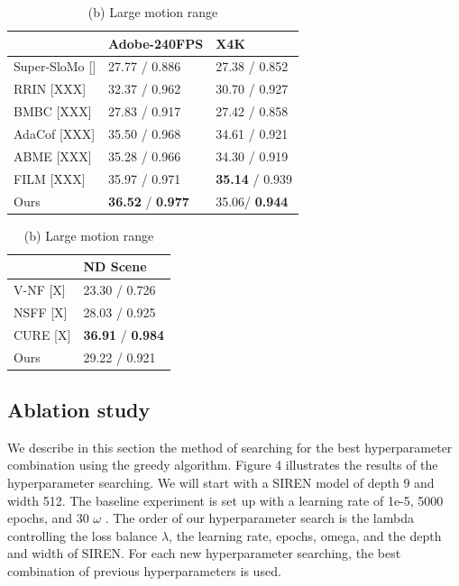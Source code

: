 \documentclass{article}
\begin{document}
\begin{table}[!tb]
    \caption{Quantitative comparison to state-of-the-art VFI on Standard benchmarks. Results are formatted as PSNR / SSMI.}
    \begin{minipage}{.5\linewidth}
      \centering
      \caption*{(a) Limited motion range}
      \begin{tabular}[t]{l | l | l }
       &  Adobe-240FPS &  X4K  \\
      \hline
      Super-SloMo [] &  27.77 / 0.886 & 27.38 / 0.852  \\
      RRIN [XXX]  & 32.37 / 0.962 & 30.70 / 0.927  \\
      BMBC [XXX]  & 27.83 / 0.917 & 27.42 / 0.858   \\
      AdaCof [XXX] & 35.50 / 0.968 & 34.61 / 0.921 \\
      ABME   [XXX] & 35.28 / 0.966 & 34.30 / 0.919 \\
      FILM   [XXX] &	35.97 / 0.971 & \textbf{35.14} / 0.939 \\
      Ours	& \textbf{36.52} / \textbf{0.977} & 35.06/ \textbf{0.944} \\
      \end{tabular}
    \end{minipage}%
    \begin{minipage}{.5\linewidth}
      \centering
      \caption*{(b) Large motion range}
        \begin{tabular}[t]{l | l }
        	    &   ND Scene  \\
        \hline
        V-NF [X]   &  23.30 / 0.726 \\
        NSFF [X]   & 28.03 / 0.925 \\
        CURE [X]   & \textbf{36.91} / \textbf{0.984} \\
        Ours	     & 29.22 / 0.921
        \end{tabular}
    \end{minipage}
\end{table}

\subsection{Ablation study}
\label{sec_abl}


We describe in this section the method of searching for the best hyperparameter combination using the greedy algorithm.
Figure 4 illustrates the results of the hyperparameter searching.
We will start with a SIREN model of depth 9 and width 512.
The baseline experiment is set up with a learning rate of 1e-5, 5000 epochs, and 30 $\omega$ .
The order of our hyperparameter search is the lambda controlling the loss balance $\lambda$, the learning rate, epochs, omega, and the depth and width of SIREN.
For each new hyperparameter searching, the best combination of previous hyperparameters is used.
\end{document}

